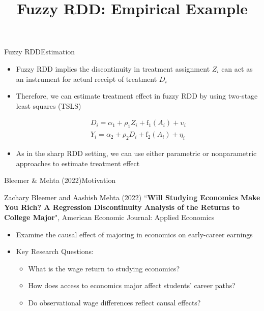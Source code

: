 \documentclass[hyperref={pdfpagelabels=false}]{beamer}
\begin{document}
\begin{frame}{Fuzzy RDD}{Estimation}
	\begin{itemize}
		\item Fuzzy RDD implies the discontinuity in treatment assignment $Z_{i}$ can act as an instrument for actual receipt of treatment $D_{i}$
		\vspace{0.2cm}
		\item Therefore, we can estimate treatment effect in fuzzy RDD by using two-stage least squares (TSLS)
		
		\begin{equation*}
			\begin{aligned}
				D_i=\alpha_{1}+\rho_{1} Z_i+\mathrm{f}_{1}(A_i)+\upsilon_i   \\
				Y_i=\alpha_{2}+\rho_{2} D_i+\mathrm{f}_{2}(A_i)+\eta_i
			\end{aligned}
		\end{equation*}
		
		\item As in the sharp RDD setting, we can use either parametric or nonparametric approaches to estimate treatment effect
		
	\end{itemize}
\end{frame}



\title[]
{Fuzzy RDD: Empirical Example}

\author
{}

\institute{}

\date
{}

\begin{frame}{}
	\titlepage
\end{frame}

\begin{frame}{Bleemer \& Mehta (2022)}{Motivation}
	
	Zachary Bleemer and Aashish Mehta (2022) ``\textbf{Will Studying Economics Make You Rich? A Regression Discontinuity Analysis of the Returns to College Major}", American Economic Journal: Applied Economics
	
	\begin{itemize}
				\vspace{0.2cm}
		\item Examine the causal effect of majoring in economics on early-career earnings
		
		\vspace{0.2cm}
		\item Key Research Questions:
				\vspace{0.2cm}
		\begin{itemize}
			\item What is the wage return to studying economics?
					\vspace{0.2cm}
			\item How does access to economics major affect students' career paths?
					\vspace{0.2cm}
			\item Do observational wage differences reflect causal effects?
		\end{itemize}
	\end{itemize}
	
\end{frame}
\end{document}
